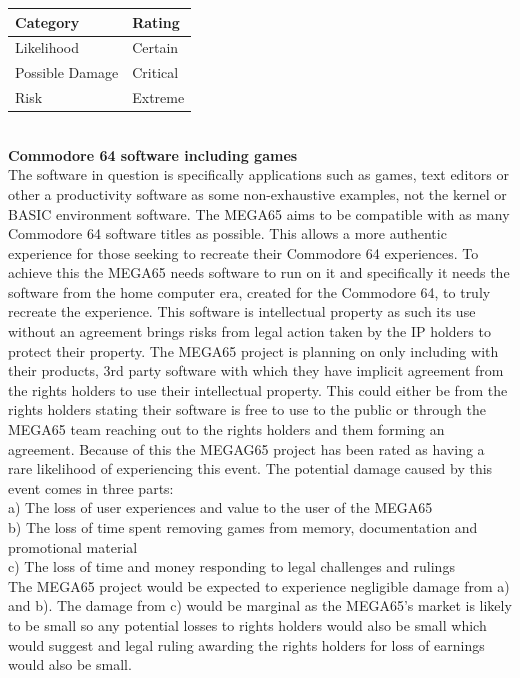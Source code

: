 \begin{tabular}{l|l} %
    	\textbf{Category} 	&	\textbf{Rating} \\
      \hline
     Likelihood			&	Certain \\
     Possible Damage 	& 	Critical \\
     Risk 				&	Extreme		\\	
    \end{tabular} \\


\textbf{Commodore 64 software including games}\\
The software in question is specifically applications such as games, text editors or other a productivity software as some non-exhaustive examples, not the kernel or BASIC environment software. The MEGA65 aims to be compatible with as many Commodore 64 software titles as possible. This allows a more authentic experience for those seeking to recreate their Commodore 64 experiences. To achieve this the MEGA65 needs software to run on it and specifically it needs the software from the home computer era, created for the Commodore 64, to truly recreate the experience. This software is intellectual property as such its use without an agreement brings risks from legal action taken by the IP holders to protect their property. The MEGA65 project is planning on only including with their products, 3rd party software with which they have implicit agreement from the rights holders to use their intellectual property. This could either be from the rights holders stating their software is free to use to the public or through the MEGA65 team reaching out to the rights holders and them forming an agreement. Because of this the MEGAG65 project has been rated as having a rare likelihood of experiencing this event. The potential damage caused by this event comes in three parts: \\
a) The loss of user experiences and value to the user of the MEGA65 \\
b) The loss of time spent removing games from memory, documentation and promotional material \\
c) The loss of time and money responding to legal challenges and rulings \\
The MEGA65 project would be expected to experience negligible damage from a) and b). The damage from c) would be marginal as the MEGA65's market is likely to be small so any potential losses to rights holders would also be small which would suggest and legal ruling awarding the rights holders for loss of earnings would also be small. \\

